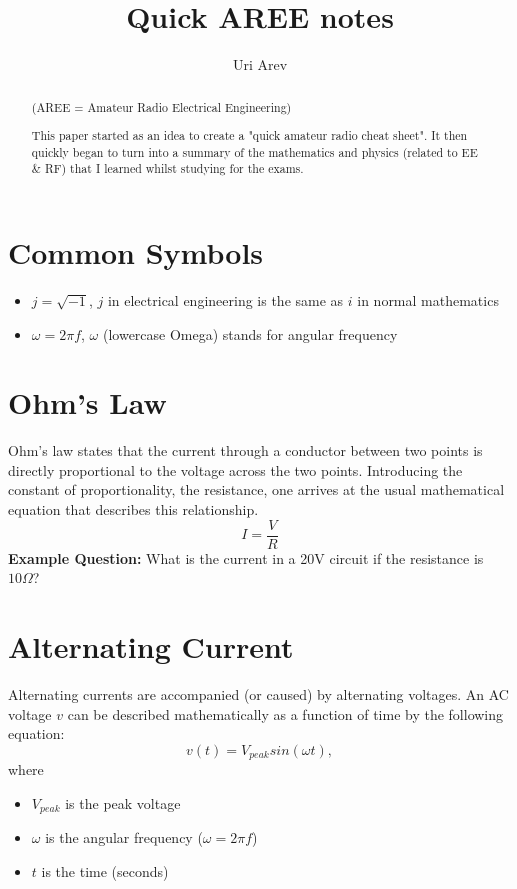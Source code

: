 \documentclass[12pt,a4paper,oneside]{article}
\author{Uri Arev}
\title{Quick AREE notes}
\date{}
\begin{document}
\maketitle
\tableofcontents
\begin{abstract}
	\begin{center}
		(AREE = Amateur Radio Electrical Engineering)
	\end{center}
	This paper started as an idea to create a "quick amateur radio cheat sheet". It then quickly began to turn into a summary of the mathematics and physics (related to EE \& RF) that I learned whilst studying for the exams.
\end{abstract}
\section{Common Symbols}
\begin{itemize}
	\item \(j = \sqrt{-1}\), \(j\) in electrical engineering is the same as \(i\) in normal mathematics
	\item \(\omega = 2 \pi f\), \(\omega\) (lowercase Omega) stands for angular frequency
\end{itemize}
\section{Ohm's Law}
Ohm's law states that the current through a conductor between two points is directly proportional to the voltage across the two points. Introducing the constant of proportionality, the resistance, one arrives at the usual mathematical equation that describes this relationship.
\[
	I = \frac VR
\]
\textbf{Example Question:} What is the current in a 20V circuit if the resistance is \(10\Omega\)?
\section{Alternating Current}
Alternating currents are accompanied (or caused) by alternating voltages. An AC voltage \(v\) can be described mathematically as a function of time by the following equation:
\[
	v(t) = V_{peak} sin(\omega t),
\]
where
\begin{itemize}
	\item \(V_{peak}\) is the peak voltage
	\item \(\omega\) is the angular frequency (\(\omega = 2 \pi f\))
	\item \(t\) is the time (seconds)
\end{itemize}
\end{document}
